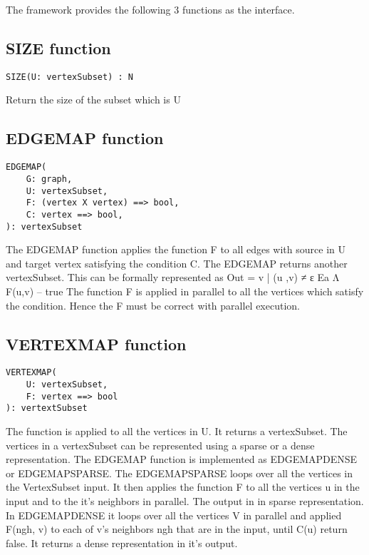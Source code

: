 \documentclass[a4paper,10pt,twoside]{article}
\begin{document}
The framework provides the following 3 functions as the interface.
\subsection{SIZE function}
\begin{lstlisting}
SIZE(U: vertexSubset) : N
\end{lstlisting}
Return the size of the subset which is \textbar U\textbar

\subsection{EDGEMAP function}
\begin{lstlisting}
EDGEMAP(
	G: graph,
	U: vertexSubset,
	F: (vertex X vertex) ==> bool,
	C: vertex ==> bool,
): vertexSubset
\end{lstlisting}

The EDGEMAP function applies the function F to all edges with source in U and target vertex satisfying the condition C. The EDGEMAP returns another vertexSubset. This can be formally represented as 
Out = { v | (u ,v) ≠ ε Ea Λ F(u,v) – true }
The function F is applied in parallel to all the vertices which satisfy the condition. Hence the F must be correct with parallel execution.


\subsection{VERTEXMAP function}
\begin{lstlisting}
VERTEXMAP(
	U: vertexSubset,
	F: vertex ==> bool
): vertextSubset
\end{lstlisting}

The function is applied to all the vertices in U. It returns a vertexSubset.
The vertices in a vertexSubset can be represented using a sparse or a dense representation. The EDGEMAP function is implemented as EDGEMAPDENSE or EDGEMAPSPARSE. The EDGEMAPSPARSE loops over all the vertices in the VertexSubset input. It then applies the function F to all the vertices u in the input and to the it's neighbors in parallel. The output in in sparse representation.
In EDGEMAPDENSE it loops over all the vertices V in parallel and applied F(ngh, v) to each of v's neighbors ngh that are in the input, until C(u) return false. It returns a dense representation in it's output.
\end{document}
